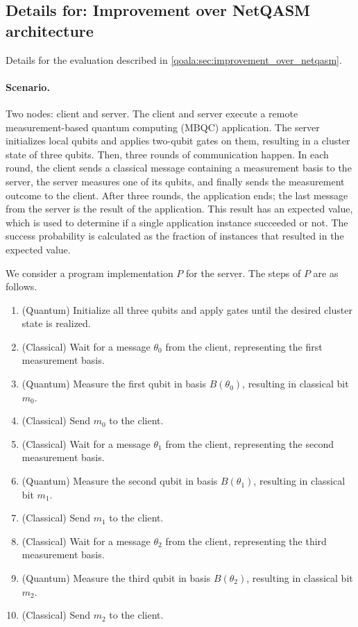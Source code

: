 \subsection{Details for: Improvement over NetQASM architecture}
Details for the evaluation described in \cref{qoala:sec:improvement_over_netqasm}.

\paragraph{Scenario.}
Two nodes: client and server.
The client and server execute a remote measurement-based quantum computing (MBQC) application.
The server initializes local qubits and applies two-qubit gates on them, resulting in a cluster state of three qubits.
Then, three rounds of communication happen.
In each round, the client sends a classical message containing a measurement basis to the server, the server measures one of its qubits, and finally sends the measurement outcome to the client.
After three rounds, the application ends; the last message from the server is the result of the application.
This result has an expected value, which is used to determine if a single application instance succeeded or not.
The success probability is calculated as the fraction of instances that resulted in the expected value.

We consider a program implementation $P$ for the server.
The steps of $P$ are as follows.
\begin{enumerate}
  \item (Quantum) Initialize all three qubits and apply gates until the desired cluster state is realized.
  \item (Classical) Wait for a message $\theta_0$ from the client, representing the first measurement basis.
  \item (Quantum) Measure the first qubit in basis $B(\theta_0)$, resulting in classical bit $m_0$.
  \item (Classical) Send $m_0$ to the client.
  \item (Classical) Wait for a message $\theta_1$ from the client, representing the second measurement basis.
  \item (Quantum) Measure the second qubit in basis $B(\theta_1)$, resulting in classical bit $m_1$.
  \item (Classical) Send $m_1$ to the client.
  \item (Classical) Wait for a message $\theta_2$ from the client, representing the third measurement basis.
  \item (Quantum) Measure the third qubit in basis $B(\theta_2)$, resulting in classical bit $m_2$.
  \item (Classical) Send $m_2$ to the client.
\end{enumerate}

